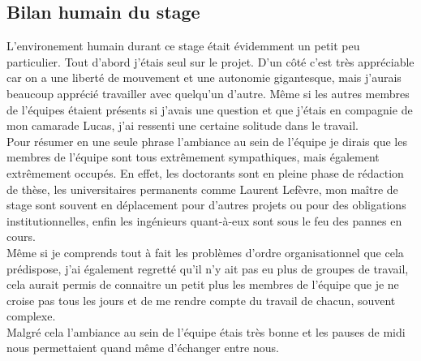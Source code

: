 \subsection{Bilan humain du stage}
L'environement humain durant ce stage était évidemment un petit peu particulier. Tout d'abord j'étais seul sur le projet. D'un côté c'est très appréciable car on a une liberté de mouvement et une autonomie gigantesque, mais j'aurais beaucoup apprécié travailler avec quelqu'un d'autre. Même si les autres membres de l'équipes étaient présents si j'avais une question et que j'étais en compagnie de mon camarade Lucas, j'ai ressenti une certaine solitude dans le travail.\\

Pour résumer en une seule phrase l'ambiance au sein de l'équipe je dirais que les membres de l'équipe sont tous extrêmement sympathiques, mais également extrêmement occupés. En effet, les doctorants sont en pleine phase de rédaction de thèse, les universitaires permanents comme Laurent Lefèvre, mon maître de stage sont souvent en déplacement pour d'autres projets ou pour des obligations institutionnelles, enfin les ingénieurs quant-à-eux sont sous le feu des pannes en cours.\\

Même si je comprends tout à fait les problèmes d'ordre organisationnel que cela prédispose, j'ai également regretté qu'il n'y ait pas eu plus de groupes de travail, cela aurait permis de connaitre un petit plus les membres de l'équipe que je ne croise pas tous les jours et de me rendre compte du travail de chacun, souvent complexe.\\

Malgré cela l'ambiance au sein de l'équipe étais très bonne et les pauses de midi nous permettaient quand même d'échanger entre nous.
